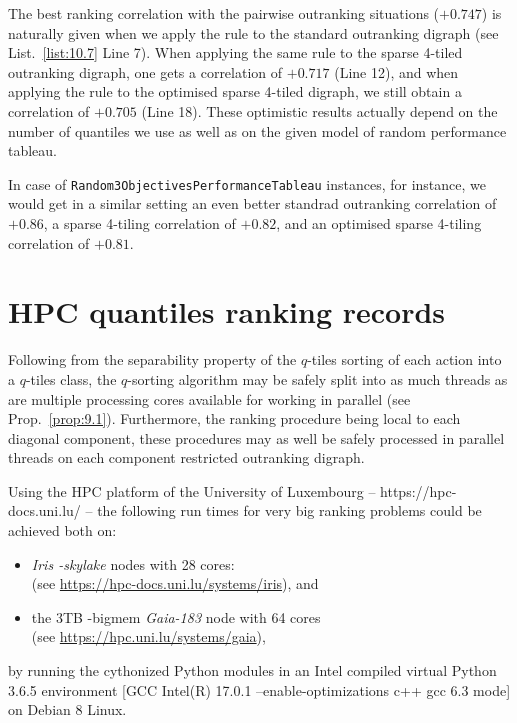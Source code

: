 The best ranking correlation with the pairwise outranking situations ($+0.747$) is naturally given when we apply the \Copeland rule to the standard outranking digraph (see List.~\vref{list:10.7} Line 7). When applying the same rule to the sparse 4-tiled outranking digraph, one gets a correlation of $+0.717$ (Line 12), and when applying the \Copeland rule to the optimised sparse 4-tiled digraph, we still obtain a correlation of $+0.705$ (Line 18). These optimistic results actually depend on the number of quantiles we use as well as on the given model of random performance tableau.

In case of \texttt{Random3ObjectivesPerformanceTableau} instances, for instance, we would get in a similar setting an even better standrad outranking correlation of $+0.86$, a sparse 4-tiling correlation of $+0.82$, and an optimised sparse 4-tiling correlation of $+0.81$.

\section{HPC quantiles ranking records}
\label{sec:11.6}

Following from the separability property of the $q$-tiles sorting of each action into a $q$-tiles class, the $q$-sorting algorithm may be safely split into as much threads as are multiple processing cores available for working in parallel (see Prop.~\ref{prop:9.1}). Furthermore, the ranking procedure being local to each diagonal component, these procedures may as well be safely processed in parallel threads on each component restricted outranking digraph.

Using the HPC platform of the University of Luxembourg -- https://hpc-docs.uni.lu/ \citep{UNI-2014}-- the following run times for very big ranking problems could be achieved both on:
\begin{itemize}[topsep=1pt]
\item \emph{Iris -skylake} nodes with 28 cores:\\
  (see \href{https://hpc-docs.uni.lu/systems/iris/}{https://hpc-docs.uni.lu/systems/iris}), and
\item the 3TB -bigmem \emph{Gaia-183} node with 64 cores \\
  (see \href{https://hpc.uni.lu/systems/gaia/}{https://hpc.uni.lu/systems/gaia}),
\end{itemize}
by running the cythonized Python modules in an Intel compiled virtual Python 3.6.5 environment [GCC Intel(R) 17.0.1 –enable-optimizations c++ gcc 6.3 mode] on Debian 8 Linux.

